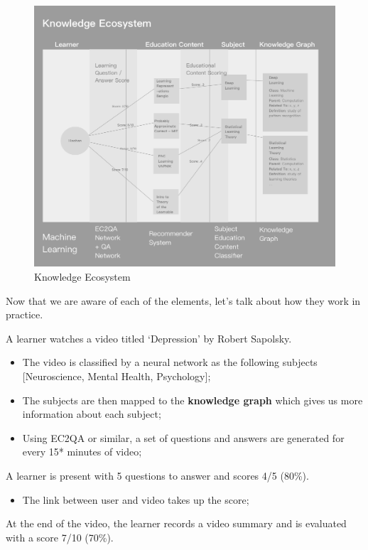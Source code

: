 \documentclass[]{book}
\providecommand{\tightlist}{%
  \setlength{\itemsep}{0pt}\setlength{\parskip}{0pt}}
\theoremstyle{definition}
\theoremstyle{definition}
\theoremstyle{definition}
\theoremstyle{remark}
\begin{document}
\begin{figure}
\centering
\includegraphics{img/knowledgeEcosystem.png}
\caption{Knowledge Ecosystem}
\end{figure}

Now that we are aware of each of the elements, let's talk about how they
work in practice.

A learner watches a video titled `Depression' by Robert Sapolsky.

\begin{itemize}
\item
  The video is classified by a neural network as the following subjects
  {[}Neuroscience, Mental Health, Psychology{]};
\item
  The subjects are then mapped to the \textbf{knowledge graph} which
  gives us more information about each subject;
\item
  Using EC2QA or similar, a set of questions and answers are generated
  for every 15* minutes of video;
\end{itemize}

A learner is present with 5 questions to answer and scores 4/5 (80\%).

\begin{itemize}
\tightlist
\item
  The link between user and video takes up the score;
\end{itemize}

At the end of the video, the learner records a video summary and is
evaluated with a score 7/10 (70\%).
\end{document}

